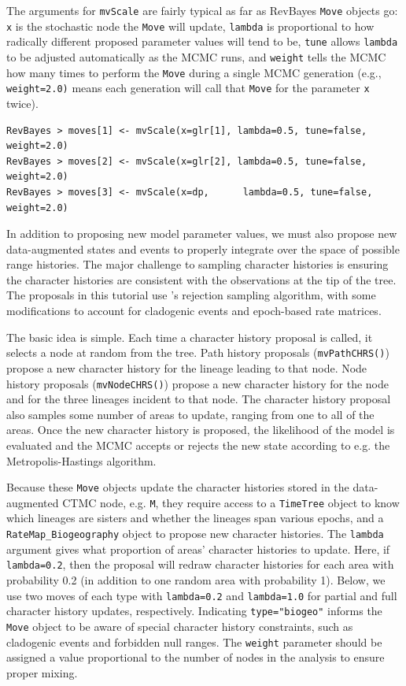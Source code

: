 \documentclass[11pt]{article}
\begin{document}
The arguments for {\tt mvScale} are fairly typical as far as RevBayes {\tt Move} objects go: {\tt x} is the stochastic node the {\tt Move} will update, {\tt lambda} is proportional to how radically different proposed parameter values will tend to be, {\tt tune} allows {\tt lambda} to be adjusted automatically as the MCMC runs, and {\tt weight} tells the MCMC how many times to perform the {\tt Move} during a single MCMC generation (e.g., {\tt weight=2.0)} means each generation will call that {\tt Move} for the parameter {\tt x} twice).


\begin{snugshade}
\begin{lstlisting}
RevBayes > moves[1] <- mvScale(x=glr[1], lambda=0.5, tune=false, weight=2.0)
RevBayes > moves[2] <- mvScale(x=glr[2], lambda=0.5, tune=false, weight=2.0)
RevBayes > moves[3] <- mvScale(x=dp, 	  lambda=0.5, tune=false, weight=2.0)
\end{lstlisting}
\end{snugshade}

In addition to proposing new model parameter values, we must also propose new data-augmented states and events to properly integrate over the space of possible range histories.
The major challenge to sampling character histories is ensuring the character histories are consistent with the observations at the tip of the tree.
The proposals in this tutorial use \citet{nielsen02}'s rejection sampling algorithm, with some modifications to account for cladogenic events and epoch-based rate matrices.

The basic idea is simple.
Each time a character history proposal is called, it selects a node at random from the tree.
Path history proposals ({\tt mvPathCHRS()}) propose a new character history for the lineage leading to that node.
Node history proposals ({\tt mvNodeCHRS()}) propose a new character history for the node and for the three lineages incident to that node.
The character history proposal also samples some number of areas to update, ranging from one to all of the areas.
Once the new character history is proposed, the likelihood of the model is evaluated and the MCMC accepts or rejects the new state according to e.g. the Metropolis-Hastings algorithm.

Because these {\tt Move} objects update the character histories stored in the data-augmented CTMC node, e.g. {\tt M},
they require access to a {\tt TimeTree} object to know which lineages are sisters and whether the lineages span various epochs, and a {\tt RateMap\_Biogeography} object to propose new character histories.
The {\tt lambda} argument gives what proportion of areas' character histories to update.
Here, if {\tt lambda=0.2}, then the proposal will redraw character histories for each area with probability 0.2 (in addition to one random area with probability 1).
Below, we use two moves of each type with {\tt lambda=0.2} and {\tt lambda=1.0} for partial and full character history updates, respectively.
Indicating {\tt type="biogeo"} informs the {\tt Move} object to be aware of special character history constraints, such as cladogenic events and forbidden null ranges.
The {\tt weight} parameter should be assigned a value proportional to the number of nodes in the analysis to ensure proper mixing.
\end{document}
